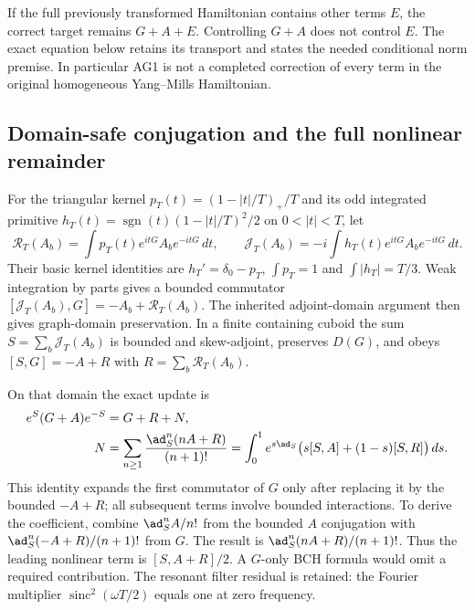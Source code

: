 If the full previously transformed Hamiltonian contains other terms $E$, the correct target remains $G+A+E$. Controlling $G+A$ does not control $E$. The exact equation below retains its transport and states the needed conditional norm premise. In particular AG1 is not a completed correction of every term in the original homogeneous Yang--Mills Hamiltonian.

\subsection{Domain-safe conjugation and the full nonlinear remainder}
For the triangular kernel $p_T(t)=(1-|t|/T)_+/T$ and its odd integrated primitive
$h_T(t)=\operatorname{sgn}(t)(1-|t|/T)^2/2$ on $0<|t|<T$, let
\begin{equation}
\mathcal R_T(A_b)=\int p_T(t)e^{itG}A_be^{-itG}\,dt,
\qquad
\mathcal J_T(A_b)=-i\int h_T(t)e^{itG}A_be^{-itG}\,dt.
\label{r27:eq:filters}
\end{equation}
Their basic kernel identities are $h_T'=\delta_0-p_T$, $\int p_T=1$ and
$\int|h_T|=T/3$. Weak integration by parts gives a bounded commutator
$[\mathcal J_T(A_b),G]=-A_b+\mathcal R_T(A_b)$. The inherited adjoint-domain argument then gives graph-domain preservation. In a finite containing cuboid the sum $S=\sum_b\mathcal J_T(A_b)$ is bounded and skew-adjoint, preserves $D(G)$, and obeys
$[S,G]=-A+R$ with $R=\sum_b\mathcal R_T(A_b)$.

On that domain the exact update is
\begin{align}
e^S(G+A)e^{-S}&=G+R+N,\nonumber\\
N&=\sum_{n\ge1}\frac{\ad_S^n(nA+R)}{(n+1)!}
=\int_0^1e^{s\ad_S}\bigl(s[S,A]+(1-s)[S,R]\bigr)\,ds.
\label{r27:eq:bch}
\end{align}
This identity expands the first commutator of $G$ only after replacing it by the bounded $-A+R$; all subsequent terms involve bounded interactions. To derive the coefficient, combine $\ad_S^nA/n!$ from the bounded $A$ conjugation with $\ad_S^n(-A+R)/(n+1)!$ from $G$. The result is $\ad_S^n(nA+R)/(n+1)!$. Thus the leading nonlinear term is $[S,A+R]/2$. A $G$-only BCH formula would omit a required contribution. The resonant filter residual is retained: the Fourier multiplier $\operatorname{sinc}^2(\omega T/2)$ equals one at zero frequency.

